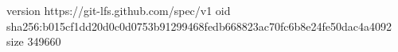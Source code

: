 version https://git-lfs.github.com/spec/v1
oid sha256:b015cf1dd20d0c0d0753b91299468fedb668823ac70fc6b8e24fe50dac4a4092
size 349660
